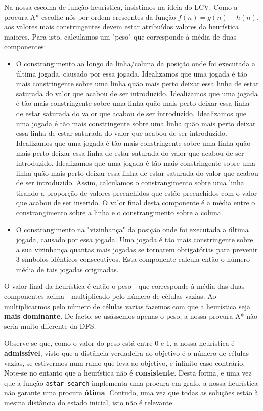 \documentclass[12pt,a4paper]{article}
\begin{document}
Na nossa escolha de função heurística, insistimos na ideia do LCV. Como a procura A* escolhe nós por ordem crescentes da função $f(n) = g(n) + h(n)$, aos valores mais constringentes devem estar atribuídos valores da heurística maiores. Para isto, calculamos um "peso" que corresponde à média de duas componentes:
\begin{itemize}
      \item O constrangimento ao longo da linha/coluna da posição onde foi executada a última jogada, causado por essa jogada.
            Idealizamos que uma jogada é tão mais constringente sobre uma linha quão mais perto deixar essa linha de estar saturada do valor que acabou de ser introduzido.
            Idealizamos que uma jogada é tão mais constringente sobre uma linha quão mais perto deixar essa linha de estar saturada do valor que acabou de ser introduzido.
            Idealizamos que uma jogada é tão mais constringente sobre uma linha quão mais perto deixar essa linha de estar saturada do valor que acabou de ser introduzido.
            Idealizamos que uma jogada é tão mais constringente sobre uma linha quão mais perto deixar essa linha de estar saturada do valor que acabou de ser introduzido.
            Idealizamos que uma jogada é tão mais constringente sobre uma linha quão mais perto deixar essa linha de estar saturada do valor que acabou de ser introduzido.
            Assim, calculamos o constrangimento sobre uma linha tirando a proporção de valores preenchidos que estão preenchidos com o valor que acabou de ser inserido.
            O valor final desta componente é a média entre o constrangimento sobre a linha e o constrangimento sobre a coluna.
      \item O constrangimento na "vizinhança" da posição onde foi executada a última jogada, causado por essa jogada.
            Uma jogada é tão mais constringente sobre a sua vizinhança quantas mais jogadas se tornarem obrigatórias para prevenir 3 símbolos idênticos consecutivos.
            Esta componente calcula então o número média de tais jogadas originadas.
\end{itemize}

O valor final da heurística é então o peso - que corresponde à média das duas componentes acima - multiplicado pelo número de células vazias.
Ao multiplicarmos pelo número de células vazias fazemos com que a heurística seja \textbf{mais dominante}.
De facto, se usássemos apenas o peso, a nossa procura A* não seria muito diferente da DFS.

Observe-se que, como o valor do peso está entre 0 e 1, a nossa heurística é \textbf{admissível}, visto que a distância verdadeira ao objetivo é o número de células vazias, se estivermos num ramo que leva ao objetivo, e infinito caso contrário.
Note-se no entanto que a heurística não é \textbf{consistente}.
Desta forma, e uma vez que a função \texttt{astar\_search} implementa uma procura em grafo, a nossa heurística não garante uma procura \textbf{ótima}.
Contudo, uma vez que todas as soluções estão à mesma distância do estado inicial, isto não é relevante.
\end{document}
